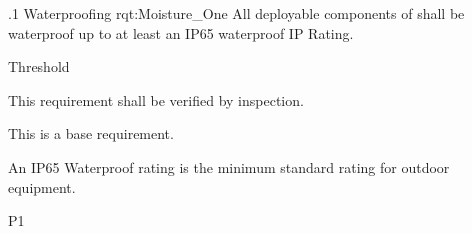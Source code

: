 \ONERQMTVKSA
{\RqtNumberBase.1}
{Waterproofing}
{rqt:Moisture_One}
{All deployable components of \ThisSys shall be waterproof up to at least an IP65 waterproof IP Rating.}
{
	\item [Phase 1] Threshold
}
{This requirement shall be verified by inspection.}
{
\item [N/A] This is a base requirement.
}
{
	\item An IP65 Waterproof rating is the minimum standard rating for outdoor equipment.
}
{P1}

